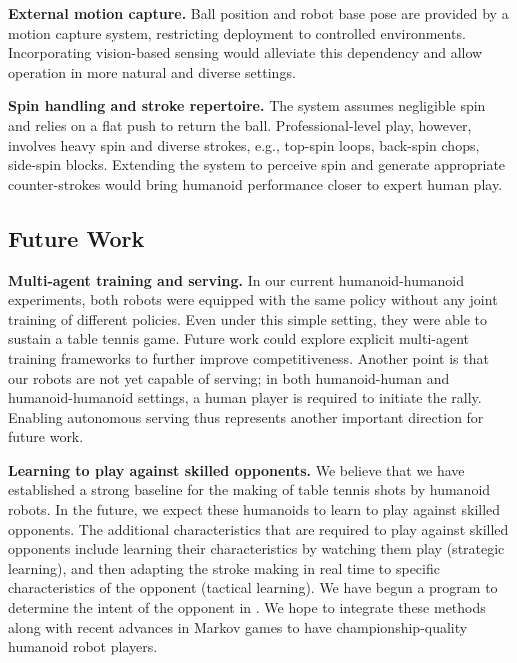 \textbf{External motion capture.} Ball position and robot base pose are provided by a motion capture system, restricting deployment to controlled environments. Incorporating vision-based sensing would alleviate this dependency and allow operation in more natural and diverse settings.

\textbf{Spin handling and stroke repertoire.} The system assumes negligible spin and relies on a flat push to return the ball. Professional-level play, however, involves heavy spin and diverse strokes, e.g., top-spin loops, back-spin chops, side-spin blocks. Extending the system to perceive spin and generate appropriate counter-strokes would bring humanoid performance closer to expert human play.

\subsection{Future Work}
\textbf{Multi-agent training and serving.} In our current humanoid-humanoid experiments, both robots were equipped with the same policy without any joint training of different policies. Even under this simple setting, they were able to sustain a table tennis game. Future work could explore explicit multi-agent training frameworks to further improve competitiveness. Another point is that our robots are not yet capable of serving; in both humanoid-human and humanoid-humanoid settings, a human player is required to initiate the rally. Enabling autonomous serving thus represents another important direction for future work.


\textbf{Learning to play against skilled opponents.} We believe that we have established a strong baseline for the making of table tennis shots by humanoid robots. In the future, we expect these humanoids to learn to play against skilled opponents. The additional characteristics that are required to play against skilled opponents include learning their characteristics by watching them play (strategic learning), and then adapting the stroke making in real time to specific characteristics of the opponent (tactical learning). We have begun a program to determine the intent of the opponent in \cite{etaat2025latte}. We hope to integrate these methods along with recent advances in Markov games \cite{KMS2025} to have championship-quality humanoid robot players. 
